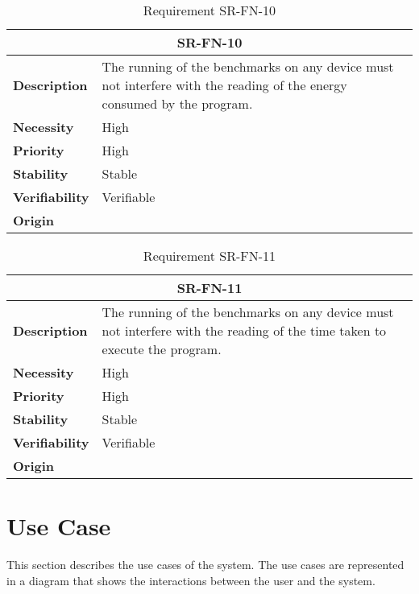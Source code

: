 \begin{table}[H]
    \centering
    \begin{tabular}{l p{10cm}}
        \toprule
        \multicolumn{2}{c}{SR-FN-10} \\
        \toprule
        \textbf{Description}        &  The running of the benchmarks on any device must not interfere with the reading of the energy consumed by the program. \\
        \textbf{Necessity}          &  High \\
        \textbf{Priority}           &  High \\
        \textbf{Stability}          &  Stable \\
        \textbf{Verifiability}      & Verifiable \\
        \textbf{Origin}             & \textit{\nameref{tab:ur-ca-09}} \\
    \end{tabular}
    \caption{Requirement SR-FN-10}
    \label{tab:sr-fn-10}
\end{table}

\begin{table}[H]
    \centering
    \begin{tabular}{l p{10cm}}
        \toprule
        \multicolumn{2}{c}{SR-FN-11} \\
        \toprule
        \textbf{Description}        &  The running of the benchmarks on any device must not interfere with the reading of the time taken to execute the program. \\
        \textbf{Necessity}          &  High \\
        \textbf{Priority}           &  High \\
        \textbf{Stability}          &  Stable \\
        \textbf{Verifiability}      & Verifiable \\
        \textbf{Origin}             & \textit{\nameref{tab:ur-ca-09}} \\
    \end{tabular}
    \caption{Requirement SR-FN-11}
    \label{tab:sr-fn-11}
\end{table}

\section{Use Case}
\label{sec:use-case}

This section describes the use cases of the system. The use cases are represented in a diagram that shows the interactions between the user and the system. 


